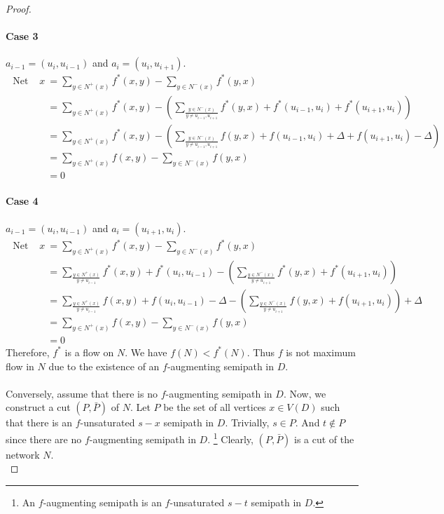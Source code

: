 \begin{proof}
	\paragraph{Case 3} $a_{i-1} = (u_i, u_{i-1})$ and $a_i = (u_i,u_{i+1})$.
	\begin{align*}
		\text{ Net flow out of } x
		& = \sum_{y \in N^+(x)} f^*(x,y) - \sum_{y \in N^-(x)} f^*(y,x) \\
		& = \sum_{y \in N^+(x)} f^*(x,y) - \left( \sum_{\frac{y \in N^-(x)}{y \ne u_{i-1}, u_{i+1}}} f^*(y,x) + f^*(u_{i-1},u_i) + f^*(u_{i+1},u_i) \right)\\
		& = \sum_{y \in N^+(x)} f^*(x,y) - \left( \sum_{\frac{y \in N^-(x)}{y \ne u_{i-1}, u_{i+1}}} f(y,x) + f(u_{i-1},u_i) + \Delta + f(u_{i+1},u_i) - \Delta \right)\\
		& = \sum_{y \in N^+(x)} f(x,y) - \sum_{y \in N^-(x)} f(y,x) \\
		& = 0
	\end{align*}

	\paragraph{Case 4} $a_{i-1} = (u_i,u_{i-1})$ and $a_i = (u_{i+1},u_i)$.
	\begin{align*}
		\text{ Net flow out of } x
		& = \sum_{y \in N^+(x)} f^*(x,y) - \sum_{y \in N^-(x)} f^*(y,x) \\
		& = \sum_{\frac{y \in N^+(x)}{y \ne u_{i-1}}} f^*(x,y) + f^*(u_i,u_{i-1}) - \left( \sum_{\frac{y \in N^-(x)}{y \ne u_{i+1}}} f^*(y,x) + f^*(u_{i+1},u_i) \right)\\
		& = \sum_{\frac{y \in N^+(x)}{y \ne u_{i-1}}} f(x,y) + f(u_i,u_{i-1}) - \Delta - \left( \sum_{\frac{y \in N^-(x)}{y \ne u_{i+1}}} f(y,x) + f(u_{i+1},u_i) \right) + \Delta \\
		& = \sum_{y \in N^+(x)} f(x,y) - \sum_{y \in N^-(x)} f(y,x) \\
		& = 0
	\end{align*}
	Therefore, $f^*$ is a flow on $N$.
	We have $f(N) < f^*(N)$.
	Thus $f$ is not maximum flow in $N$ due to the existence of an $f$-augmenting semipath in $D$.

	\paragraph{}Conversely, assume that there is no $f$-augmenting semipath in $D$.
	Now, we construct a cut $(P,\bar{P})$ of $N$.
	Let $P$ be the set of all vertices $x \in V(D)$ such that there is an $f$-unsaturated $s-x$ semipath in $D$.
	Trivially, $s \in P$.
	And $t \notin P$ since there are no $f$-augmenting semipath in $D$.
	\footnote{An $f$-augmenting semipath is an $f$-unsaturated $s-t$ semipath in $D$.}
	Clearly, $(P,\bar{P})$ is a cut of the network $N$.\\



\end{proof}
